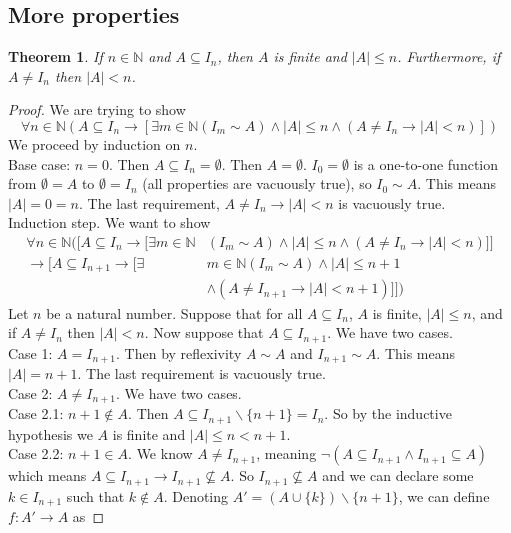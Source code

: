 \documentclass{report}
\newtheorem*{theorem}{Theorem}
\theoremstyle{definition}
\begin{document}
\subsection{More properties}
\begin{theorem}
If $n\in\mathbb N$ and $A\subseteq I_n$, then $A$ is finite and $|A|\leq n$. Furthermore, if $A\neq I_n$ then 
$|A|<n$.
\end{theorem}
\begin{proof}
We are trying to show
\begin{equation*}
\forall n\in\mathbb N(A\subseteq I_n\to[\exists m\in\mathbb N(I_m\sim A)\land|A|\leq n\land
(A\neq I_n\to|A|<n)])
\end{equation*}
We proceed by induction on $n$.\\
\indent Base case: $n=0$. Then $A\subseteq I_n=\emptyset$.
Then $A=\emptyset$. $I_0=\emptyset$ is a one-to-one function from $\emptyset=A$ to $\emptyset=I_n$ (all properties
are vacuously true), so $I_0\sim A$. This means $|A|=0=n$.
The last requirement, $A\neq I_n\to|A|<n$ is vacuously true.\\
\indent Induction step. We want to show
\begin{align*}
\forall n\in\mathbb N([A\subseteq I_n\to[\exists m\in\mathbb N&(I_m\sim A)\land|A|\leq n\land
(A\neq I_n\to|A|<n)]]\\
\to[A\subseteq I_{n+1}\to[\exists& m\in\mathbb N(I_m\sim A)\land|A|\leq n+1\\
&\land(A\neq I_{n+1}\to|A|<n+1)]])
\end{align*}
Let $n$ be a natural number. Suppose that for all $A\subseteq I_n$, $A$ is finite, $|A|\leq n$, and if 
$A\neq I_n$ then $|A|<n$. Now suppose that $A\subseteq I_{n+1}$. We have two cases.\\ 
\indent Case 1: $A=I_{n+1}$. Then by
reflexivity $A\sim A$ and $I_{n+1}\sim A$. This means $|A|=n+1$. The last requirement is vacuously true.\\
\indent Case 2: $A\neq I_{n+1}$. We have two cases.\\
\indent Case 2.1: $n+1\notin A$. Then $A\subseteq I_{n+1}\backslash\{n+1\}=I_n$. So by the inductive hypothesis we 
$A$ is finite and $|A|\leq n<n+1$.\\
\indent Case 2.2: $n+1\in A$. We know $A\neq I_{n+1}$, meaning $\neg(A\subseteq I_{n+1}\land I_{n+1}\subseteq A)$
which means $A\subseteq I_{n+1}\to I_{n+1}\nsubseteq A$. So $I_{n+1}\nsubseteq A$ and we can declare some 
$k\in I_{n+1}$ such that $k\notin A$. Denoting $A'=(A\cup\{k\})\backslash\{n+1\}$, we can define $f:A'\to A$ as

\end{proof}
\end{document}
